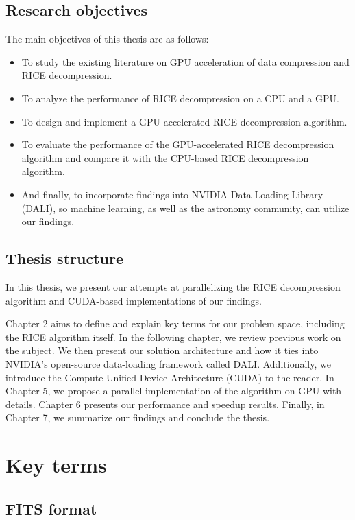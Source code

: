 \documentclass[licencjacka,en]{pracamgr}
\begin{document}
\section{Research objectives}
The main objectives of this thesis are as follows:

\begin{itemize}
    \item To study the existing literature on GPU acceleration of data compression and RICE decompression.
    \item To analyze the performance of RICE decompression on a CPU and a GPU.
    \item To design and implement a GPU-accelerated RICE decompression algorithm.
    \item To evaluate the performance of the GPU-accelerated RICE decompression algorithm and compare it with the CPU-based RICE decompression algorithm.
    \item And finally, to incorporate findings into NVIDIA Data Loading Library (DALI)\cite{dali-docs}, so machine learning, as well as the astronomy community, can utilize our findings.
\end{itemize}

\section{Thesis structure}
In this thesis, we present our attempts at parallelizing the RICE decompression algorithm and CUDA-based implementations of our findings. 

 Chapter 2 aims to define and explain key terms for our problem space, including the RICE algorithm itself. In the following chapter, we review previous work on the subject. We then present our solution architecture and how it ties into NVIDIA's open-source data-loading framework called DALI. Additionally, we introduce the Compute Unified Device Architecture (CUDA) to the reader. In Chapter 5, we propose a parallel implementation of the algorithm on GPU with details. Chapter 6 presents our performance and speedup results. Finally, in Chapter 7, we summarize our findings and conclude the thesis.

\chapter{Key terms}\label{r:pojecia}

\section{FITS format}
\end{document}
